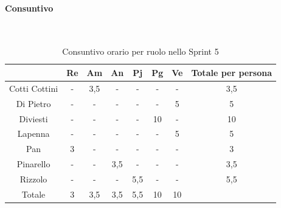 \documentclass{article}
\begin{document}
                \paragraph{Consuntivo}\mbox{}\\
                \begin{table}[H]
                    \centering
                    \begin{tabular}{|c|c|c|c|c|c|c|c|}
                    \hline
                                    & Re  & Am  & An  & Pj  & Pg  & Ve  & Totale per persona \\ \hline
                    Cotti Cottini & -   & 3,5 & -   & -   & -   & -   & 3,5                \\ \hline
                    Di Pietro     & -   & -   & -   & -   & -   & 5   & 5                  \\ \hline
                    Diviesti      & -   & -   & -   & -   & 10  & -   & 10                 \\ \hline
                    Lapenna       & -   & -   & -   & -   & -   & 5   & 5                  \\ \hline
                    Pan           & 3   & -   & -   & -   & -   & -   & 3                  \\ \hline
                    Pinarello     & -   & -   & 3,5 & -   & -   & -   & 3,5                \\ \hline
                    Rizzolo       & -   & -   & -   & 5,5 & -   & -   & 5,5                \\ \hline
                    Totale        & 3   & 3,5 & 3,5 & 5,5 & 10  & 10  &                    \\ \hline
                    \end{tabular}
                    \caption{Consuntivo orario per ruolo nello Sprint 5}
                \end{table}

\end{document}
